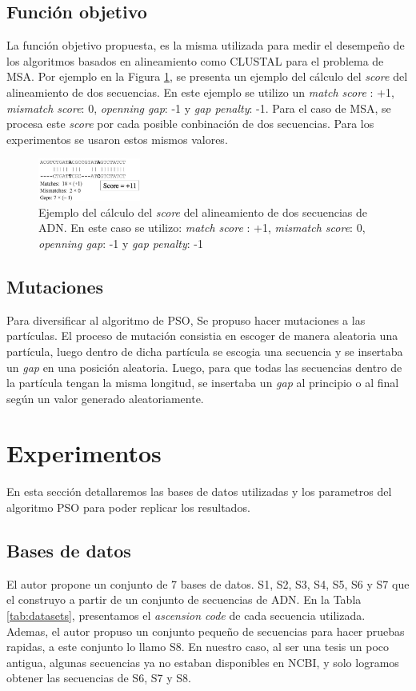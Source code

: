\documentclass[conference]{IEEEtran}
\begin{document}
\subsection{Función objetivo}
La función objetivo propuesta, es la misma utilizada para medir el desempeño de los algoritmos basados en alineamiento como CLUSTAL para el problema de MSA. Por ejemplo en la Figura \ref{fig:fo}, se presenta un ejemplo del cálculo del \textit{score} del alineamiento de dos secuencias. En este ejemplo se utilizo un  \textit{match score} : +1, \textit{mismatch score}: 0, \textit{openning gap}: -1 y \textit{gap penalty}: -1. Para el caso de MSA, se procesa este \textit{score} por cada posible conbinación de dos secuencias. Para los experimentos se usaron estos mismos valores.

\begin{figure}[h]
	\centering
	\includegraphics[width=0.3\textwidth]{images/fo}
	\caption{Ejemplo del cálculo del \textit{score} del alineamiento de dos secuencias de ADN. En este caso se utilizo: \textit{match score} : +1, \textit{mismatch score}: 0, \textit{openning gap}: -1 y \textit{gap penalty}: -1}
	\label{fig:fo}
\end{figure}

\subsection{Mutaciones}
Para diversificar al algoritmo de PSO, Se propuso hacer mutaciones a las partículas. El proceso de mutación consistia en escoger de manera aleatoria una partícula, luego dentro de dicha partícula se escogia una secuencia y se insertaba un \textit{gap} en una posición aleatoria. Luego, para que todas las secuencias dentro de la partícula tengan la misma longitud, se insertaba un \textit{gap} al principio o al final según un valor generado aleatoriamente.


\section{Experimentos}

En esta sección detallaremos las bases de datos utilizadas y los parametros del algoritmo PSO para poder replicar los resultados.

\subsection{Bases de datos}
El autor propone un conjunto de 7 bases de datos. S1, S2, S3, S4, S5, S6 y S7 que el construyo a partir de un conjunto de secuencias de ADN. En la Tabla \ref{tab:datasets}, presentamos el \textit{ascension code} de cada secuencia utilizada. Ademas, el autor propuso un conjunto pequeño de secuencias para hacer pruebas rapidas, a este conjunto lo llamo S8. En nuestro caso, al ser una tesis un poco antigua, algunas secuencias ya no estaban disponibles en NCBI, y solo logramos obtener las secuencias de S6, S7 y S8. \\
\end{document}
